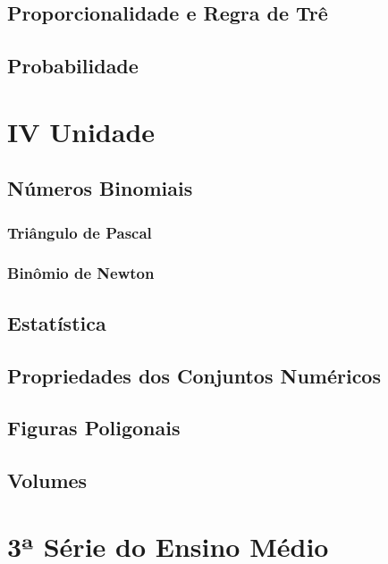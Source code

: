 \documentclass[12pt,a4paper]{book}
\begin{document}
\chapter{Proporcionalidade e Regra de Trê}
\chapter{Probabilidade}

\part*{IV Unidade}

\chapter{Números Binomiais}
	\section{Triângulo de Pascal}
	\section{Binômio de Newton}

\chapter{Estatística}

\chapter{Propriedades dos Conjuntos Numéricos}

\chapter{Figuras Poligonais}

\chapter{Volumes}


\part{3ª Série do Ensino Médio}
\end{document}
